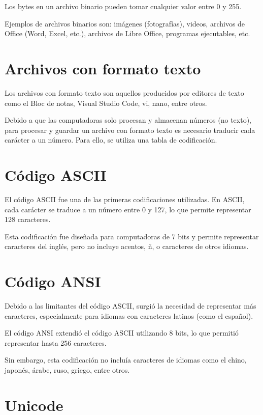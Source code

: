 \documentclass[11pt,a4paper,oneside]{book}
\begin{document}
Los bytes en un archivo binario pueden tomar cualquier valor entre 0 y 255.

Ejemplos de archivos binarios son: imágenes (fotografías), videos, archivos de Office (Word, Excel, etc.), archivos de Libre Office, programas ejecutables, etc.

\section{Archivos con formato texto}

Los archivos con formato texto son aquellos producidos por editores de texto como el Bloc de notas, Visual Studio Code, vi, nano, entre otros.

Debido a que las computadoras solo procesan y almacenan números (no texto), para procesar y guardar un archivo con formato texto es necesario traducir cada carácter a un número. Para ello, se utiliza una tabla de codificación.

\section{Código ASCII}

El código ASCII fue una de las primeras codificaciones utilizadas. En ASCII, cada carácter se traduce a un número entre 0 y 127, lo que permite representar 128 caracteres.

Esta codificación fue diseñada para computadoras de 7 bits y permite representar caracteres del inglés, pero no incluye acentos, ñ, o caracteres de otros idiomas.

\section{Código ANSI}

Debido a las limitantes del código ASCII, surgió la necesidad de representar más caracteres, especialmente para idiomas con caracteres latinos (como el español).

El código ANSI extendió el código ASCII utilizando 8 bits, lo que permitió representar hasta 256 caracteres.

Sin embargo, esta codificación no incluía caracteres de idiomas como el chino, japonés, árabe, ruso, griego, entre otros.

\section{Unicode}
\end{document}
